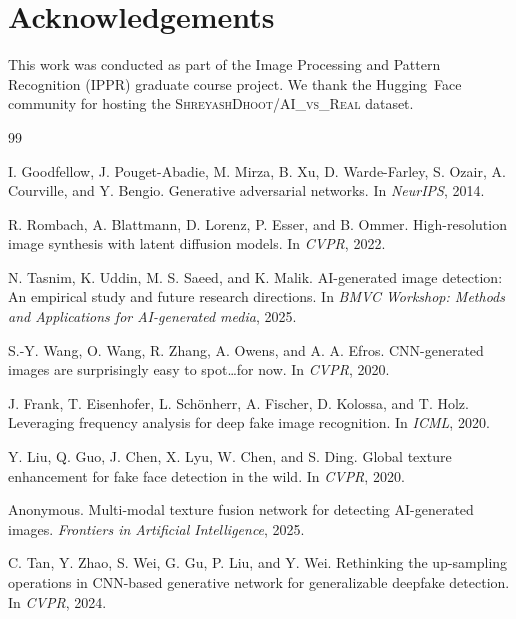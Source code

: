 \documentclass[10pt,twocolumn]{article}
\begin{document}
\section*{Acknowledgements}
This work was conducted as part of the Image Processing and Pattern
Recognition (IPPR) graduate course project.
We thank the Hugging~Face community for hosting the
\textsc{ShreyashDhoot/AI\_vs\_Real} dataset.

\begin{thebibliography}{99}

I. Goodfellow, J. Pouget-Abadie, M. Mirza, B. Xu, D. Warde-Farley,
S. Ozair, A. Courville, and Y. Bengio.
\newblock Generative adversarial networks.
\newblock In \emph{NeurIPS}, 2014.

R. Rombach, A. Blattmann, D. Lorenz, P. Esser, and B. Ommer.
\newblock High-resolution image synthesis with latent diffusion models.
\newblock In \emph{CVPR}, 2022.

N. Tasnim, K. Uddin, M. S. Saeed, and K. Malik.
\newblock AI-generated image detection: An empirical study and future research
  directions.
\newblock In \emph{BMVC Workshop: Methods and Applications for
  AI-generated media}, 2025.

S.-Y. Wang, O. Wang, R. Zhang, A. Owens, and A. A. Efros.
\newblock CNN-generated images are surprisingly easy to spot\ldots for now.
\newblock In \emph{CVPR}, 2020.

J. Frank, T. Eisenhofer, L. Sch{\"o}nherr, A. Fischer, D. Kolossa, and
  T. Holz.
\newblock Leveraging frequency analysis for deep fake image recognition.
\newblock In \emph{ICML}, 2020.

Y. Liu, Q. Guo, J. Chen, X. Lyu, W. Chen, and S. Ding.
\newblock Global texture enhancement for fake face detection in the wild.
\newblock In \emph{CVPR}, 2020.

Anonymous.
\newblock Multi-modal texture fusion network for detecting AI-generated images.
\newblock \emph{Frontiers in Artificial Intelligence}, 2025.

C. Tan, Y. Zhao, S. Wei, G. Gu, P. Liu, and Y. Wei.
\newblock Rethinking the up-sampling operations in CNN-based generative network
  for generalizable deepfake detection.
\newblock In \emph{CVPR}, 2024.


\end{thebibliography}
\end{document}
